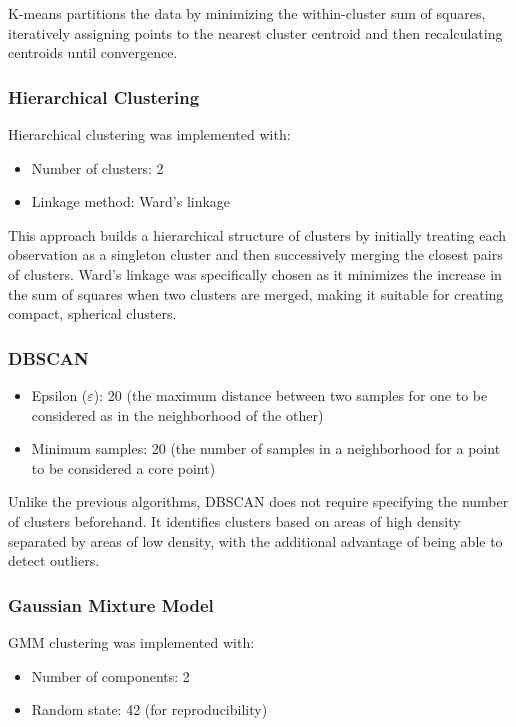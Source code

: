 \documentclass[a4paper,12pt]{report}
\begin{document}
K-means partitions the data by minimizing the within-cluster sum of squares, iteratively assigning points to the nearest cluster centroid and then recalculating centroids until convergence.

\subsubsection{Hierarchical Clustering}
Hierarchical clustering was implemented with:
\begin{itemize}
    \item Number of clusters: 2
    \item Linkage method: Ward's linkage
\end{itemize}

This approach builds a hierarchical structure of clusters by initially treating each observation as a singleton cluster and then successively merging the closest pairs of clusters. Ward's linkage was specifically chosen as it minimizes the increase in the sum of squares when two clusters are merged, making it suitable for creating compact, spherical clusters.

\subsubsection{DBSCAN}
\begin{itemize}
    \item Epsilon ($\varepsilon$): 20 (the maximum distance between two samples for one to be considered as in the neighborhood of the other)
    \item Minimum samples: 20 (the number of samples in a neighborhood for a point to be considered a core point)
\end{itemize}

Unlike the previous algorithms, DBSCAN does not require specifying the number of clusters beforehand. It identifies clusters based on areas of high density separated by areas of low density, with the additional advantage of being able to detect outliers.

\subsubsection{Gaussian Mixture Model}
GMM clustering was implemented with:
\begin{itemize}
    \item Number of components: 2
    \item Random state: 42 (for reproducibility)
\end{itemize}
\end{document}
